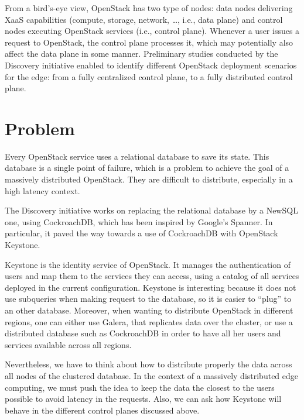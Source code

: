 From a bird’s-eye view, OpenStack has two type of nodes: data nodes delivering XaaS capabilities (compute, storage, network, \dots, i.e., data plane) and control nodes executing OpenStack services (i.e., control plane). Whenever a user issues a request to OpenStack, the control plane processes it, which may potentially also affect the data plane in some manner. Preliminary studies conducted by the Discovery initiative enabled to identify different OpenStack deployment scenarios for the edge: from a fully centralized control plane, to a fully distributed control plane\cite{cherrueau:hal-01812747}.


\section{Problem}

Every OpenStack service uses a relational database to save its state. This database is a single point of failure, which is a problem to achieve the goal of a massively distributed OpenStack. They are difficult to distribute, especially in a high latency context.

The Discovery initiative works on replacing the relational database by a NewSQL one, using CockroachDB, which has been inspired by Google's Spanner\cite{CRDB:HLC}. In particular, it paved the way towards a use of CockroachDB with OpenStack Keystone.

Keystone is the identity service of OpenStack. It manages the authentication of users and map them to the services they can access, using a catalog of all services deployed in the current configuration. Keystone is interesting because it does not use subqueries when making request to the database, so it is easier to ``plug'' to an other database. Moreover, when wanting to distribute OpenStack in different regions, one can either use Galera, that replicates data over the cluster, or use a distributed database such as CockroachDB in order to have all her users and services available across all regions.

Nevertheless, we have to think about how to distribute properly the data across all nodes of the clustered database. In the context of a massively distributed edge computing, we must push the idea to keep the data the closest to the users possible to avoid latency in the requests. Also, we can ask how Keystone will behave in the different control planes discussed above.
